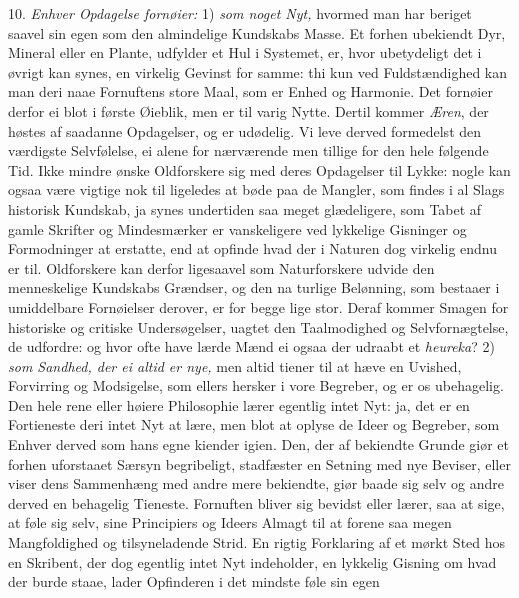 \documentclass[12pt,a4paper]{article}
\newcommand{\opage}[1]{\marginnote{\footnotesize\textit{[#1]}}}
\begin{document}
10. \emph{Enhver Opdagelse fornøier:} 1) \emph{som noget Nyt,} hvormed man har beriget
saavel sin egen som den almindelige Kundskabs Masse. Et forhen ubekiendt Dyr, Mineral eller
en Plante, udfylder et Hul i Systemet, er, hvor ubetydeligt det i øvrigt kan synes, en
virkelig Gevinst for samme: thi kun ved Fuldstændighed kan man deri naae Fornuftens store
Maal, som er Enhed og Harmonie. Det fornøier derfor ei blot i første Øieblik, men er til
varig Nytte. Dertil kommer \emph{Æren}, der høstes af saadanne Opdagelser, og er udødelig.
Vi leve derved formedelst den værdigste Selvfølelse, ei alene for nærværende men tillige
for den hele følgende Tid. Ikke mindre ønske Oldforskere sig med deres Opdagelser til
Lykke: nogle kan ogsaa være vigtige nok til ligeledes at bøde paa de Mangler, som findes i
al Slags historisk Kundskab, ja synes undertiden saa meget glædeligere, som Tabet af gamle
Skrifter og Mindesmærker er vanskeligere ved lykkelige Gisninger og Formodninger at
erstatte, end at opfinde hvad der i Naturen dog virkelig endnu er til. Oldforskere kan
derfor ligesaavel som Naturforskere udvide den menneskelige Kundskabs Grændser, og den na%
\opage{248}turlige Belønning, som bestaaer i umiddelbare Fornøielser derover, er for begge lige stor.
Deraf kommer Smagen for historiske og critiske Undersøgelser, uagtet den Taalmodighed og
Selvfornægtelse, de udfordre: og hvor ofte have lærde Mænd ei ogsaa der udraabt et
\emph{heureka}? 2) \emph{som Sandhed, der ei altid er nye,} men altid tiener til at hæve en
Uvished, Forvirring og Modsigelse, som ellers hersker i vore Begreber, og er os
ubehagelig. Den hele rene eller høiere Philosophie lærer egentlig intet Nyt: ja, det er en
Fortieneste deri intet Nyt at lære, men blot at oplyse de Ideer og Begreber, som Enhver
derved som hans egne kiender igien. Den, der af bekiendte Grunde giør et forhen uforstaaet
Særsyn begribeligt, stadfæster en Setning med nye Beviser, eller viser dens Sammenhæng med
andre mere bekiendte, giør baade sig selv og andre derved en behagelig Tieneste. Fornuften
bliver sig bevidst eller lærer, saa at sige, at føle sig selv, sine Principiers og Ideers
Almagt til at forene saa megen Mangfoldighed og tilsyneladende Strid. En rigtig Forklaring
af et mørkt Sted hos en Skribent, der dog egentlig intet Nyt indeholder, en lykkelig
Gisning om hvad der burde staae, lader Opfinderen i det mindste føle sin egen
\end{document}
